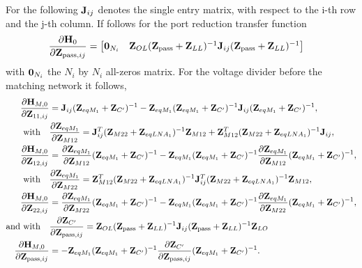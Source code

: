 For the following $\mathbf{J}_{ij}$ denotes the single entry matrix, with respect to the i-th row and the j-th column.
If follows for the port reduction transfer function
\begin{align}
\label{eq:H0_sig_grad}
\frac{\partial\mathbf{H}_{0}}{\partial\mathbf{Z}_{\text{pass},ij}}&=
\begin{bmatrix}
\mathbf{0}_{N_i} & \mathbf{Z}_{OL}(\mathbf{Z}_\text{pass}+\mathbf{Z}_{LL})^{-1}\mathbf{J}_{ij}(\mathbf{Z}_{\text{pass}}+\mathbf{Z}_{LL})^{-1}
\end{bmatrix}
\end{align}
with $\mathbf{0}_{N_i}$ the $N_i$ by $N_i$ all-zeros matrix.
For the voltage divider before the matching network it follows,
\begin{align}
\label{eq:HM0_sig_grad}
\frac{\partial\mathbf{H}_{M,0}}{\partial\mathbf{Z}_{11,ij}}&=
\mathbf{J}_{ij}(\mathbf{Z}_{eqM_1} + \mathbf{Z}_{C'})^{-1} - \mathbf{Z}_{eqM_1}(\mathbf{Z}_{eqM_1} + \mathbf{Z}_{C'})^{-1}\mathbf{J}_{ij}(\mathbf{Z}_{eqM_1} + \mathbf{Z}_{C'})^{-1},\\\nonumber
\text{with}\quad&\frac{\partial\mathbf{Z}_{eqM_1}}{\partial\mathbf{Z}_{M12}} = \mathbf{J}_{ij}^T(\mathbf{Z}_{M22} + \mathbf{Z}_{eqLNA_1})^{-1}\mathbf{Z}_{M12} + \mathbf{Z}_{M12}^T(\mathbf{Z}_{M22} + \mathbf{Z}_{eqLNA_1})^{-1}\mathbf{J}_{ij},\\
\frac{\partial\mathbf{H}_{M,0}}{\partial\mathbf{Z}_{12,ij}}&=
\frac{\partial\mathbf{Z}_{eqM_1}}{\partial\mathbf{Z}_{M12}}(\mathbf{Z}_{eqM_1} + \mathbf{Z}_{C'})^{-1} -
\mathbf{Z}_{eqM_1}(\mathbf{Z}_{eqM_1} + \mathbf{Z}_{C'})^{-1}\frac{\partial\mathbf{Z}_{eqM_1}}{\partial\mathbf{Z}_{M12}}(\mathbf{Z}_{eqM_1} + \mathbf{Z}_{C'})^{-1},\\\nonumber
\text{with}\quad&\frac{\partial\mathbf{Z}_{eqM_1}}{\partial\mathbf{Z}_{M22}} = \mathbf{Z}_{M12}^T(\mathbf{Z}_{M22} + \mathbf{Z}_{eqLNA_1})^{-1}\mathbf{J}_{ij}^T(\mathbf{Z}_{M22} + \mathbf{Z}_{eqLNA_1})^{-1}\mathbf{Z}_{M12},\\
\frac{\partial\mathbf{H}_{M,0}}{\partial\mathbf{Z}_{22,ij}}&=
\frac{\partial\mathbf{Z}_{eqM_1}}{\partial\mathbf{Z}_{M22}}(\mathbf{Z}_{eqM_1} + \mathbf{Z}_{C'})^{-1} -
\mathbf{Z}_{eqM_1}(\mathbf{Z}_{eqM_1} + \mathbf{Z}_{C'})^{-1}\frac{\partial\mathbf{Z}_{eqM_1}}{\partial\mathbf{Z}_{M22}}(\mathbf{Z}_{eqM_1} + \mathbf{Z}_{C'})^{-1},\\\nonumber
\text{and with}\quad&\frac{\partial\mathbf{Z}_{C'}}{\partial\mathbf{Z}_{\text{pass},ij}} = 
\mathbf{Z}_{OL}(\mathbf{Z}_{\text{pass}}+\mathbf{Z}_{LL})^{-1}\mathbf{J}_{ij}(\mathbf{Z}_{\text{pass}}+\mathbf{Z}_{LL})^{-1}\mathbf{Z}_{LO}\\
\frac{\partial\mathbf{H}_{M,0}}{\partial\mathbf{Z}_{\text{pass},ij}}&=
-\mathbf{Z}_{eqM_1}(\mathbf{Z}_{eqM_1} + \mathbf{Z}_{C'})^{-1}\frac{\partial\mathbf{Z}_{C'}}{\partial\mathbf{Z}_{\text{pass},ij}}(\mathbf{Z}_{eqM_1} + \mathbf{Z}_{C'})^{-1}.
\end{align}
